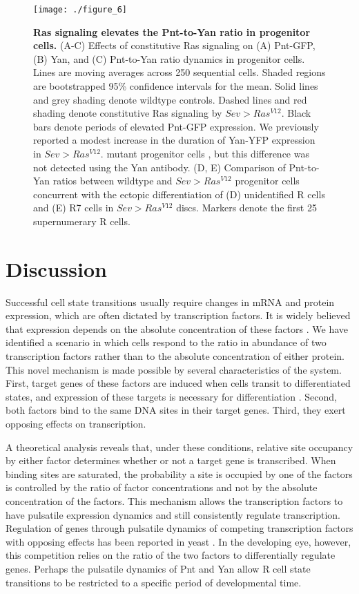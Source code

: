 \begin{figure}[h!]
\centering
\texttt{[image: ./figure\_6]}
\caption[Ras signaling elevates the Pnt-to-Yan ratio in progenitor cells.]{\textbf{Ras signaling elevates the Pnt-to-Yan ratio in progenitor cells.} (A-C) Effects of constitutive Ras signaling on (A) Pnt-GFP, (B) Yan, and (C) Pnt-to-Yan ratio dynamics in progenitor cells. Lines are moving averages across 250 sequential cells. Shaded regions are bootstrapped 95\% confidence intervals for the mean. Solid lines and grey shading denote wildtype controls. Dashed lines and red shading denote constitutive Ras signaling by $Sev>Ras^{V12}$. Black bars denote periods of elevated Pnt-GFP expression. We previously reported a modest increase in the duration of Yan-YFP expression in $Sev>Ras^{V12}$. mutant progenitor cells \cite{Pelaez2015a}, but this difference was not detected using the Yan antibody. (D, E) Comparison of Pnt-to-Yan ratios between wildtype and $Sev>Ras^{V12}$ progenitor cells concurrent with the ectopic differentiation of (D) unidentified R cells and (E) R7 cells in $Sev>Ras^{V12}$ discs. Markers denote the first 25 supernumerary R cells.}
\label{fig:ratio:fig6}
\end{figure}

\section{Discussion}

Successful cell state transitions usually require changes in mRNA and protein expression, which are often dictated by transcription factors. It is widely believed that expression depends on the absolute concentration of these factors \cite{Spitz2012}. We have identified a scenario in which cells respond to the ratio in abundance of two transcription factors rather than to the absolute concentration of either protein. This novel mechanism is made possible by several characteristics of the system. First, target genes of these factors are induced when cells transit to differentiated states, and expression of these targets is necessary for differentiation \cite{Xu2000,Nagaraj2002}. Second, both factors bind to the same DNA sites in their target genes. Third, they exert opposing effects on transcription.

A theoretical analysis reveals that, under these conditions, relative site occupancy by either factor determines whether or not a target gene is transcribed. When binding sites are saturated, the probability a site is occupied by one of the factors is controlled by the ratio of factor concentrations and not by the absolute concentration of the factors. This mechanism allows the transcription factors to have pulsatile expression dynamics and still consistently regulate transcription. Regulation of genes through pulsatile dynamics of competing transcription factors with opposing effects has been reported in yeast \cite{Lin2015}. In the developing eye, however, this competition relies on the ratio of the two factors to differentially regulate genes. Perhaps the pulsatile dynamics of Pnt and Yan allow R cell state transitions to be restricted to a specific period of developmental time.

